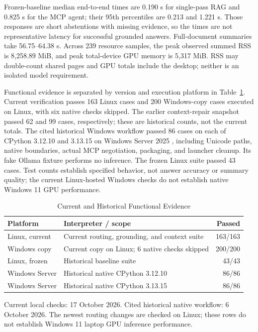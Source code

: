 \documentclass[conference,letterpaper]{IEEEtran}
\begin{document}
Frozen-baseline median end-to-end times are 0.190 s for single-pass RAG and 0.825 s for the MCP agent; their 95th percentiles are 0.213 and 1.221 s. Those responses are short abstentions with missing evidence, so the times are not representative latency for successful grounded answers. Full-document summaries take 56.75--64.38 s. Across 239 resource samples, the peak observed summed RSS is 8,258.89 MiB, and peak total-device GPU memory is 5,317 MiB. RSS may double-count shared pages and GPU totals include the desktop; neither is an isolated model requirement.

Functional evidence is separated by version and execution platform in Table~\ref{tab:functional}. Current verification passes 163 Linux cases and 200 Windows-copy cases executed on Linux, with six native checks skipped. The earlier context-repair snapshot passed 62 and 99 cases, respectively; these are historical counts, not the current totals. The cited historical Windows workflow passed 86 cases on each of CPython 3.12.10 and 3.13.15 on Windows Server 2025 \cite{winci}, including Unicode paths, native boundaries, actual MCP negotiation, packaging, and launcher cleanup. Its fake Ollama fixture performs no inference. The frozen Linux suite passed 43 cases. Test counts establish specified behavior, not answer accuracy or summary quality; the current Linux-hosted Windows checks do not establish native Windows 11 GPU performance.

\begin{table}[t]
\caption{Current and Historical Functional Evidence}
\label{tab:functional}
\centering\small
\begin{tabularx}{\columnwidth}{@{}lXr@{}}
\toprule
Platform & Interpreter / scope & Passed \\
\midrule
Linux, current & Current routing, grounding, and context suite & 163/163 \\
Windows copy & Current copy on Linux; 6 native checks skipped & 200/200 \\
Linux, frozen & Historical baseline suite & 43/43 \\
Windows Server & Historical native CPython 3.12.10 & 86/86 \\
Windows Server & Historical native CPython 3.13.15 & 86/86 \\
\bottomrule
\end{tabularx}
\vspace{3pt}
\parbox{\columnwidth}{\footnotesize Current local checks: 17 October 2026. Cited historical native workflow: 6 October 2026. The newest routing changes are checked on Linux; these rows do not establish Windows 11 laptop GPU inference performance.}
\end{table}
\end{document}
